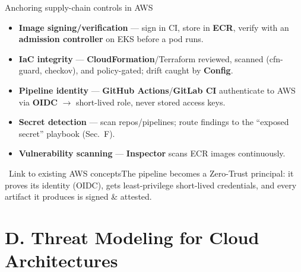 \documentclass[aspectratio=169,10pt]{beamer}
\newcommand{\svc}[1]{{\color{accent}\textsf{\textbf{#1}}}}      %
\newcommand{\term}[1]{{\color{awsink}\textbf{#1}}}
\newcommand{\bridge}[1]{%
  \begin{block}{\small\ding{43}\ Link to existing AWS concepts}\small #1\end{block}}
\begin{document}
\begin{frame}{Anchoring supply-chain controls in AWS}
  \footnotesize
  \begin{itemize}
    \item \term{Image signing/verification} --- sign in CI, store in \svc{ECR}, verify with an
          \term{admission controller} on EKS before a pod runs.
    \item \term{IaC integrity} --- \svc{CloudFormation}/Terraform reviewed, scanned (cfn-guard, checkov),
          and policy-gated; drift caught by \svc{Config}.
    \item \term{Pipeline identity} --- \svc{GitHub Actions}/\svc{GitLab CI} authenticate to AWS via
          \term{OIDC} $\to$ short-lived role, never stored access keys.
    \item \term{Secret detection} --- scan repos/pipelines; route findings to the
          ``exposed secret'' playbook (Sec.~F).
    \item \term{Vulnerability scanning} --- \svc{Inspector} scans ECR images continuously.
  \end{itemize}
  \vfill
  \bridge{The pipeline becomes a Zero-Trust principal: it proves its identity (OIDC), gets
  least-privilege short-lived credentials, and every artifact it produces is signed \& attested.}
\end{frame}

\section{D. Threat Modeling for Cloud Architectures}
\end{document}
